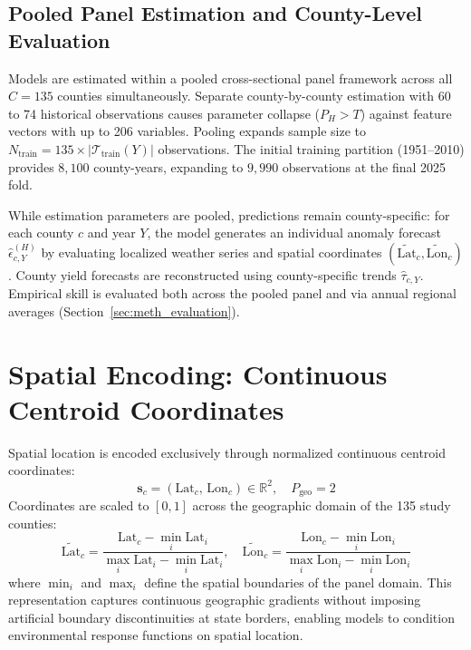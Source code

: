 \subsection{Pooled Panel Estimation and County-Level Evaluation}
\label{sec:meth_pooled_panel}

Models are estimated within a pooled cross-sectional panel framework across all $C = 135$ counties simultaneously. Separate county-by-county estimation with 60 to 74 historical observations causes parameter collapse ($P_H > T$) against feature vectors with up to 206 variables. Pooling expands sample size to $N_{\text{train}} = 135 \times |\mathcal{T}_{\text{train}}(Y)|$ observations. The initial training partition (1951--2010) provides $8{,}100$ county-years, expanding to $9{,}990$ observations at the final 2025 fold.

While estimation parameters are pooled, predictions remain county-specific: for each county $c$ and year $Y$, the model generates an individual anomaly forecast $\hat{\epsilon}_{c,Y}^{(H)}$ by evaluating localized weather series and spatial coordinates $(\tilde{\text{Lat}}_c, \tilde{\text{Lon}}_c)$. County yield forecasts are reconstructed using county-specific trends $\hat{\tau}_{c,Y}$. Empirical skill is evaluated both across the pooled panel and via annual regional averages (Section~\ref{sec:meth_evaluation}).


\section{Spatial Encoding: Continuous Centroid Coordinates}
\label{sec:meth_spatial_covariates}

Spatial location is encoded exclusively through normalized continuous centroid coordinates:
\begin{equation}
    \mathbf{s}_c = (\text{Lat}_c, \, \text{Lon}_c) \in \mathbb{R}^2, \quad P_{\text{geo}} = 2
    \label{eq:spatial_coordinates}
\end{equation}
Coordinates are scaled to $[0, 1]$ across the geographic domain of the 135 study counties:
\begin{equation}
    \tilde{\text{Lat}}_c = \frac{\text{Lat}_c - \min_{i} \text{Lat}_i}{\max_{i} \text{Lat}_i - \min_{i} \text{Lat}_i}, \quad
    \tilde{\text{Lon}}_c = \frac{\text{Lon}_c - \min_{i} \text{Lon}_i}{\max_{i} \text{Lon}_i - \min_{i} \text{Lon}_i}
    \label{eq:coord_normalization}
\end{equation}
where $\min_i$ and $\max_i$ define the spatial boundaries of the panel domain. This representation captures continuous geographic gradients without imposing artificial boundary discontinuities at state borders, enabling models to condition environmental response functions on spatial location.

